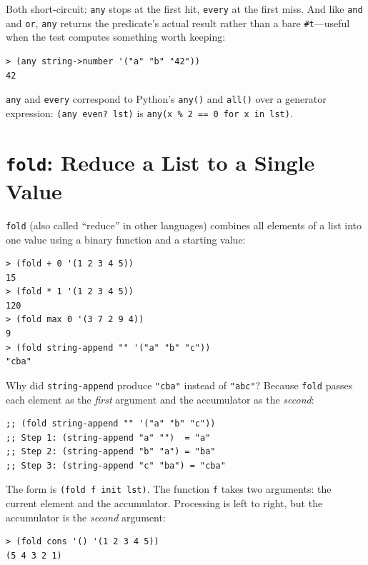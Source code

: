 Both short-circuit: \texttt{any} stops at the first hit, \texttt{every} at the first miss. And like \texttt{and} and \texttt{or}, \texttt{any} returns the predicate's actual result rather than a bare \texttt{\#t}---useful when the test computes something worth keeping:

\begin{lstlisting}[style=repl]
> (any string->number '("a" "b" "42"))
42
\end{lstlisting}

\begin{note}
\texttt{any} and \texttt{every} correspond to Python's \texttt{any()} and \texttt{all()} over a generator expression: \texttt{(any even? lst)} is \texttt{any(x \% 2 == 0 for x in lst)}.
\end{note}

\section{\texttt{fold}: Reduce a List to a Single Value}

\texttt{fold} (also called ``reduce'' in other languages) combines all elements of a list into one value using a binary function and a starting value:

\begin{lstlisting}[style=repl]
> (fold + 0 '(1 2 3 4 5))
15
> (fold * 1 '(1 2 3 4 5))
120
> (fold max 0 '(3 7 2 9 4))
9
> (fold string-append "" '("a" "b" "c"))
"cba"
\end{lstlisting}

Why did \texttt{string-append} produce \texttt{"cba"} instead of \texttt{"abc"}? Because \texttt{fold} passes each element as the \emph{first} argument and the accumulator as the \emph{second}:

\begin{lstlisting}
;; (fold string-append "" '("a" "b" "c"))
;; Step 1: (string-append "a" "")  = "a"
;; Step 2: (string-append "b" "a") = "ba"
;; Step 3: (string-append "c" "ba") = "cba"
\end{lstlisting}

The form is \texttt{(fold f init lst)}. The function \texttt{f} takes two arguments: the current element and the accumulator. Processing is left to right, but the accumulator is the \emph{second} argument:

\begin{lstlisting}[style=repl]
> (fold cons '() '(1 2 3 4 5))
(5 4 3 2 1)
\end{lstlisting}

